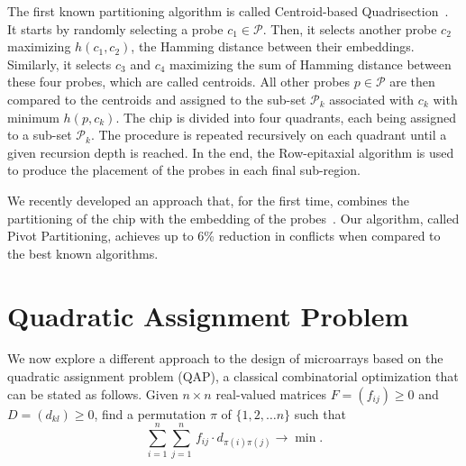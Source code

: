 \documentclass[english]{lni}
\newcommand{\ignore}[1]{}
\begin{document}
The first known partitioning algorithm is called Centroid-based
Quadrisection~\cite{KAHNG03B}. It starts by randomly selecting a probe
$c_1 \in \mathcal{P}$. Then, it selects another probe $c_2$ maximizing
$h(c_1,c_2)$, the Hamming distance between their embeddings. Similarly, it
selects $c_3$ and $c_4$ maximizing the sum of Hamming distance between these
four probes, which are called centroids. All other probes $p \in \mathcal{P}$
are then compared to the centroids and assigned to the sub-set $\mathcal{P}_k$
associated with $c_k$ with minimum $h(p,c_k)$. The chip is divided into four
quadrants, each being assigned to a sub-set $\mathcal{P}_k$.  The procedure
is repeated recursively on each quadrant until a given recursion depth is
reached. In the end, the Row-epitaxial algorithm is used to produce the
placement of the probes in each final sub-region.

We recently developed an approach that, for the first
time, combines the partitioning of the chip with the embedding of the
probes~\cite{CARVALHO06}. Our algorithm, called Pivot Partitioning, achieves
up to 6\% reduction in conflicts when compared to the best known algorithms.

\ignore{
Their results show that the running time of the row-epitaxial algorithm
drops significantly with increasing recursion depth. The time required to place
the probes of a 500\,x\,500 chip, for instance, dropped by 69\% with $L = 3$
when compared with the time required by the row-epitaxial without any
partitioning.
It is not clear from their experiments, however, how the choice of $L$ impaired
the performance of the row-epitaxial algorithm in terms of solution quality
since they have restricted their experiments to $L \leq 3$. Moreover, there is
no clear trend toward reduction or increase in border length as $L$ varies
from~0 to~3.
}

\section{Quadratic Assignment Problem}
\label{sec:qap}

We now explore a different approach to the design of microarrays based on the
quadratic assignment problem (QAP), a classical combinatorial optimization
that can be stated as follows. Given $n \times n$ real-valued matrices $F =
(f_{ij})\geq 0$ and $D = (d_{kl})\geq 0$, find a permutation $\pi$ of $\{1, 2,
\ldots n\}$ such that
\begin{equation}\label{eq:qap_def}
  \sum_{i=1}^{n} \sum_{j=1}^{n}\,  f_{ij} \cdot d_{\pi(i)\pi(j)} \to \min.
\end{equation}
\end{document}
